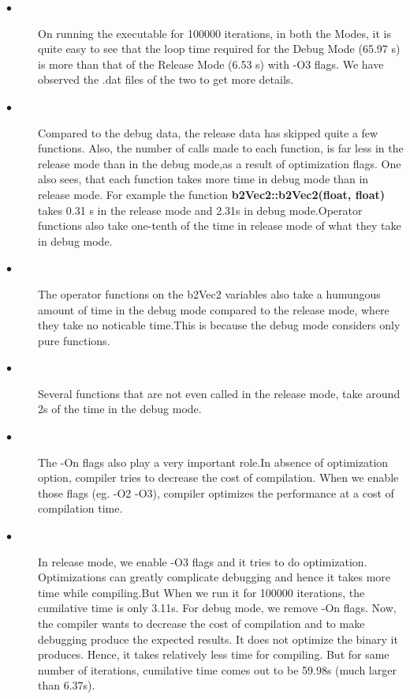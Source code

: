 \documentclass[11pt]{article}
\begin{document}
\begin{description}
\item[$\bullet$ ] On running the executable for 100000 iterations, in both the Modes, it is quite easy to see that the loop time required for the 
Debug Mode (65.97 s)
 is more than that of the Release Mode (6.53 s) with -O3 flags. We have observed the .dat files of the two to get more details.
\newline
\item[$\bullet$ ]
 Compared to the debug data, the release data has skipped quite a few functions. Also, the number of calls made to each function,
   is far less in the release mode than in the debug mode,as a result of optimization flags. One also sees, that each function 
   takes more
   time in debug mode than in release mode. For example the function {\bf b2Vec2::b2Vec2(float, float)} takes 0.31 s in the 
   release mode and 2.31s in debug mode.Operator functions also take one-tenth of the time in release mode of what they take in 
   debug mode.
\newline
\item[$\bullet$ ]
The operator functions on the b2Vec2 variables also take a humungous amount of time in the debug mode compared to the release mode, where they take no noticable time.This is because the debug mode considers only pure functions.
   \newline 
\item[$\bullet$ ]
Several functions that are not even called in the release mode, take around 2s of the time in the debug mode.
   \newline 
\item[$\bullet$ ]
The -On flags also play a very important role.In absence of optimization 
   option, compiler tries to decrease the cost of compilation. When we enable those flags (eg. -O2 -O3), compiler optimizes the 
   performance at a cost of compilation time.\newline
\item[$\bullet$ ]
In release mode, we enable -O3 flags and it tries to do optimization. Optimizations can greatly complicate debugging and hence it takes
 more time while compiling.But When we run it for 100000 iterations, the cumilative time is only 3.11s. For debug mode, we remove -On flags. Now, the compiler wants to decrease the cost of compilation and to make debugging produce the expected results. It does not optimize the binary it produces. Hence, it takes relatively less time for compiling. But for same number of iterations, cumilative time comes out to be 59.98s (much larger than 6.37s). 

\end{description}
\end{document}
